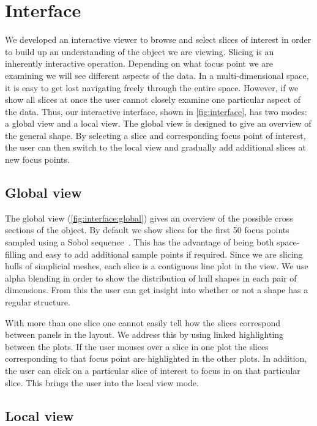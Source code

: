 \section{Interface}
\label{sec:interface}

We developed an interactive viewer to browse and select slices of interest in
order to build up an understanding of the object we are viewing. Slicing is an
inherently interactive operation. Depending on what focus point we are
examining we will see different aspects of the data. In a multi-dimensional
space, it is easy to get lost navigating freely through the entire space.
However, if we show all slices at once the user cannot closely examine one
particular aspect of the data.  Thus, our interactive interface, shown in
\autoref{fig:interface}, has two modes: a global view and a local view. The
global view is designed to give an overview of the general shape.  By selecting 
a slice and corresponding focus point of interest, the user can then
switch to the local view and gradually add additional slices at new focus
points.

\subsection{Global view}

The global view (\autoref{fig:interface:global}) gives an overview of the
possible cross sections of the object. By default we show slices for the first
50 focus points sampled using a Sobol sequence~\cite{Sobol:1967}. This has the
advantage of being both space-filling and easy to add additional sample points
if required. Since we are slicing hulls of simplicial meshes, each slice is a contiguous
line plot in the view. We use alpha blending in order to show the distribution
of hull shapes in each pair of dimensions. 
From this the user can get insight into whether or not a shape has a regular 
structure.

With more than one slice one cannot easily tell how the slices correspond 
between panels in the layout. We address this by using linked highlighting
between the plots. If the user mouses over a slice in one plot the slices
corresponding to that focus point are highlighted in the other plots. In 
addition, the user can click on a particular slice of interest to focus in 
on that particular slice. This brings the user into the local view mode.

\subsection{Local view}

